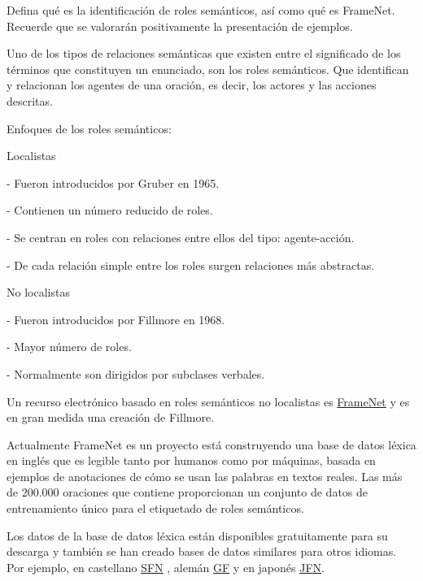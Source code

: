 \documentclass[11pt]{exam}
\begin{document}
\begin{questions}
\question Defina qué es la identificación de roles semánticos, así como qué es FrameNet. Recuerde que se valorarán positivamente la presentación de ejemplos.

Uno de los tipos de relaciones semánticas que existen entre el significado de los términos que constituyen un enunciado, son los roles semánticos. Que identifican y relacionan los agentes de una oración, es decir, los actores y las acciones descritas.

Enfoques de los roles semánticos:

\newcommand{\SubItem}[1]{
	{\setlength\itemindent{15pt} \item[-] #1}
}

\begin{itemize}
	\item Localistas
		\SubItem{Fueron introducidos por Gruber en 1965.}
		\SubItem{Contienen un número reducido de roles.}
		\SubItem {Se centran en roles con relaciones entre ellos del tipo: agente-acción.}
		\SubItem {De cada relación simple entre los roles surgen relaciones más abstractas.}
	
	\item No localistas
		\SubItem{Fueron introducidos por Fillmore en 1968.}
		\SubItem {Mayor número de roles.}
		\SubItem {Normalmente son dirigidos por subclases verbales.}
\end{itemize}

Un recurso electrónico basado en roles semánticos no localistas es \href{https://framenet.icsi.berkeley.edu/fndrupal/}{FrameNet} y es en gran medida una creación de Fillmore.

Actualmente FrameNet es un proyecto está construyendo una base de datos léxica en inglés que es legible tanto por humanos como por máquinas, basada en ejemplos de anotaciones de cómo se usan las palabras en textos reales. Las más de 200.000 oraciones que contiene proporcionan un conjunto de datos de entrenamiento único para el etiquetado de roles semánticos. 

Los datos de la base de datos léxica están disponibles gratuitamente para su descarga y también se han creado bases de datos similares para otros idiomas. Por ejemplo, en castellano \href{http://spanishfn.org/}{SFN} , alemán \href{http://www.laits.utexas.edu/gframenet/}{GF} y en japonés \href{http://jfn.st.hc.keio.ac.jp/}{JFN}.

\end{questions}
\end{document}
